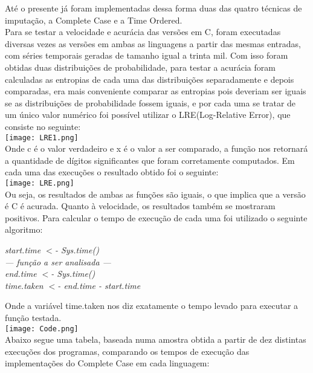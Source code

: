 \documentclass{article}
\begin{document}
Até o presente já foram implementadas dessa forma duas das quatro técnicas de imputação, a Complete Case e a Time Ordered. \\
Para se testar a velocidade e acurácia das versões em C, foram executadas diversas vezes as versões em ambas as linguagens a partir das mesmas entradas, com séries temporais geradas de tamanho igual a trinta mil. Com isso foram obtidas duas distribuições de probabilidade, para testar a acurácia foram calculadas as entropias de cada uma das distribuições separadamente e depois comparadas, era mais conveniente comparar as entropias pois deveriam ser iguais se as distribuições de probabilidade fossem iguais, e por cada uma se tratar de um único valor numérico foi possível utilizar o LRE(Log-Relative Error)\cite{almiron2010numerical}, que consiste no seguinte:\\
    
\texttt{[image: LRE1.png]}\\

Onde c é o valor verdadeiro e x é o valor a ser comparado, a função nos retornará a quantidade de dígitos significantes que foram corretamente computados. Em cada uma das execuções o resultado obtido foi o seguinte:\\
    
\texttt{[image: LRE.png]}\\

Ou seja, os resultados de ambas as funções são iguais, o que implica que a versão é C é acurada.
Quanto à velocidade, os resultados também se mostraram positivos. Para calcular o tempo de execução de cada uma foi utilizado o seguinte algoritmo:
    
\begin{flushleft}
\textit{start.time $<$- Sys.time()\\
--- função a ser analisada ---\\
end.time $<$- Sys.time()\\
time.taken $<$- end.time - start.time\\}
\end{flushleft}

Onde a variável time.taken nos diz exatamente o tempo levado para executar a função testada.\\

\texttt{[image: Code.png]}\\

Abaixo segue uma tabela, baseada numa amostra obtida a partir de dez distintas execuções dos programas, comparando os tempos de execução das implementações do Complete Case em cada linguagem:\\
\end{document}
